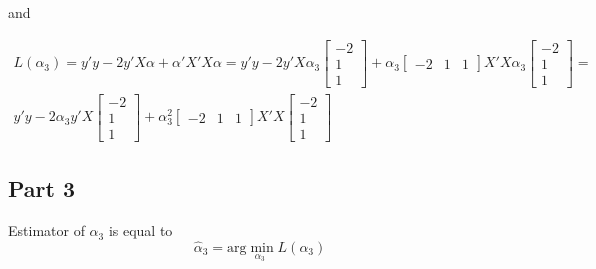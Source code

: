 \documentclass[12pt, a4paper]{article}\usepackage[]{graphicx}\usepackage[]{color}
\begin{document}
and

\begin{gather*}
L(\alpha_3) = y'y - 2y'X\alpha + \alpha'X'X\alpha = 
  y'y - 2y'X\alpha_3 \begin{bmatrix} -2 \\ 1 \\ 1 \end{bmatrix} 
  + \alpha_3 \begin{bmatrix} -2 & 1 & 1 \end{bmatrix} X'X \alpha_3 \begin{bmatrix} -2 \\ 1 \\ 1 \end{bmatrix} 
  = \\
  y'y - 2\alpha_3 y'X \begin{bmatrix} -2 \\ 1 \\ 1 \end{bmatrix} 
  + \alpha_3^2 \begin{bmatrix} -2 & 1 & 1 \end{bmatrix} X'X \begin{bmatrix} -2 \\ 1 \\ 1 \end{bmatrix}
\end{gather*}



\subsection{Part 3}
Estimator of $\alpha_3$ is equal to 
\[ \hat{\alpha}_3 = \text{arg}\min_{\alpha_3\ \ } L(\alpha_3) \]
\end{document}
